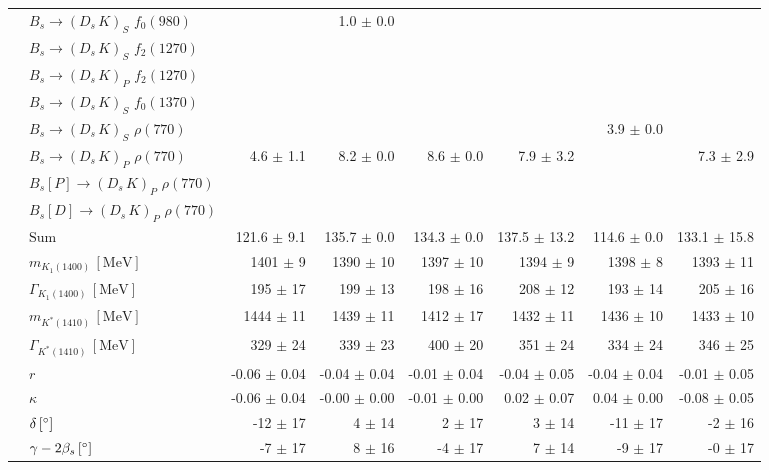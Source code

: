 \begin{tabular}{l l  r  r  r  r  r  r  }
 & $B_s \to ( D_s \, K)_{S} \, \, f_0(980)$ &  & 1.0 $\pm$ 0.0 &  &  &  &  \\ 
 & $B_s \to ( D_s \, K)_{S} \, \, f_2(1270)$ &  &  &  &  &  &  \\ 
 & $B_s \to ( D_s \, K)_{P} \, \, f_2(1270)$ &  &  &  &  &  &  \\ 
 & $B_s \to ( D_s \, K)_{S} \, \, f_0(1370)$ &  &  &  &  &  &  \\ 
 & $B_s \to ( D_s \, K)_{S} \, \, \rho(770)$ &  &  &  &  & 3.9 $\pm$ 0.0 &  \\ 
 & $B_s \to ( D_s \, K)_{P} \, \, \rho(770)$ & 4.6 $\pm$ 1.1 & 8.2 $\pm$ 0.0 & 8.6 $\pm$ 0.0 & 7.9 $\pm$ 3.2 &  & 7.3 $\pm$ 2.9 \\ 
 & $B_s[P] \to ( D_s \, K)_{P} \, \, \rho(770)$ &  &  &  &  &  &  \\ 
 & $B_s[D] \to ( D_s \, K)_{P} \, \, \rho(770)$ &  &  &  &  &  &  \\ 
 & $\text{Sum}$ & 121.6 $\pm$ 9.1 & 135.7 $\pm$ 0.0 & 134.3 $\pm$ 0.0 & 137.5 $\pm$ 13.2 & 114.6 $\pm$ 0.0 & 133.1 $\pm$ 15.8 \\ 
\hline
 & $m_{K_1(1400)} \, [\text{MeV}]$ & 1401 $\pm$ 9 & 1390 $\pm$ 10 & 1397 $\pm$ 10 & 1394 $\pm$ 9 & 1398 $\pm$ 8 & 1393 $\pm$ 11 \\ 
 & $\Gamma_{K_1(1400)} \, [\text{MeV}]$ & 195 $\pm$ 17 & 199 $\pm$ 13 & 198 $\pm$ 16 & 208 $\pm$ 12 & 193 $\pm$ 14 & 205 $\pm$ 16 \\ 
 & $m_{K^{*}(1410)} \, [\text{MeV}]$ & 1444 $\pm$ 11 & 1439 $\pm$ 11 & 1412 $\pm$ 17 & 1432 $\pm$ 11 & 1436 $\pm$ 10 & 1433 $\pm$ 10 \\ 
 & $\Gamma_{K^{*}(1410)} \, [\text{MeV}]$ & 329 $\pm$ 24 & 339 $\pm$ 23 & 400 $\pm$ 20 & 351 $\pm$ 24 & 334 $\pm$ 24 & 346 $\pm$ 25 \\ 
 & $r$ & -0.06 $\pm$ 0.04 & -0.04 $\pm$ 0.04 & -0.01 $\pm$ 0.04 & -0.04 $\pm$ 0.05 & -0.04 $\pm$ 0.04 & -0.01 $\pm$ 0.05 \\ 
 & $\kappa$ & -0.06 $\pm$ 0.04 & -0.00 $\pm$ 0.00 & -0.01 $\pm$ 0.00 & 0.02 $\pm$ 0.07 & 0.04 $\pm$ 0.00 & -0.08 $\pm$ 0.05 \\ 
 & $\delta \, [^{\circ}]$ & -12 $\pm$ 17 & 4 $\pm$ 14 & 2 $\pm$ 17 & 3 $\pm$ 14 & -11 $\pm$ 17 & -2 $\pm$ 16 \\ 
 & $\gamma - 2 \beta_{s} \, [^{\circ}]$ & -7 $\pm$ 17 & 8 $\pm$ 16 & -4 $\pm$ 17 & 7 $\pm$ 14 & -9 $\pm$ 17 & -0 $\pm$ 17 \\ 
\hline
\hline
\end{tabular}
